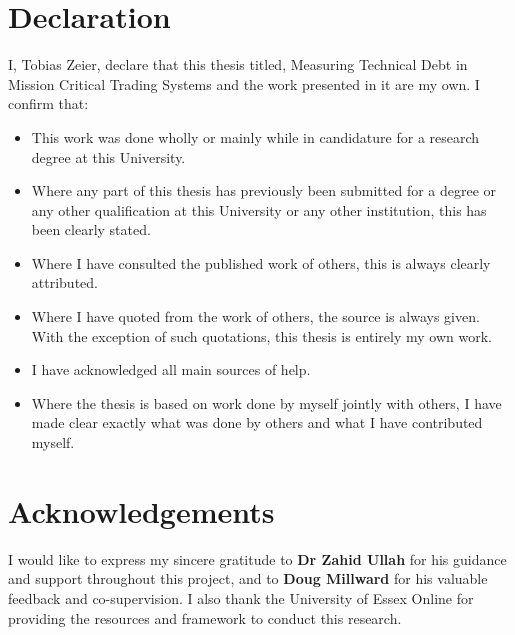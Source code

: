 \documentclass[
  british,
  12pt,
  a4paper,
]{report}
\let\cleardoublepage\clearpage
\begin{document}
\cleardoublepage


\chapter*{Declaration}

\noindent I, Tobias Zeier, declare that this thesis titled, Measuring
Technical Debt in Mission Critical Trading
Systems and the work presented in it are my own. I confirm that:

\begin{itemize} 
\item This work was done wholly or mainly while in candidature for a research degree at this University.
\item Where any part of this thesis has previously been submitted for a degree or any other qualification at this University or any other institution, this has been clearly stated.
\item Where I have consulted the published work of others, this is always clearly attributed.
\item Where I have quoted from the work of others, the source is always given. With the exception of such quotations, this thesis is entirely my own work.
\item I have acknowledged all main sources of help.
\item Where the thesis is based on work done by myself jointly with others, I have made clear exactly what was done by others and what I have contributed myself.\\
\end{itemize}

\cleardoublepage


\chapter*{Acknowledgements}

I would like to express my sincere gratitude to \textbf{Dr Zahid Ullah} for his guidance and support throughout this project, and to \textbf{Doug Millward} for his valuable feedback and co-supervision. I also thank the University of Essex Online for providing the resources and framework to conduct this research.
\end{document}
